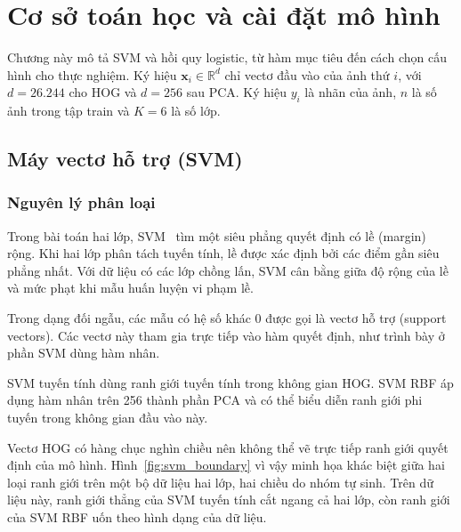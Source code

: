 \section{Cơ sở toán học và cài đặt mô hình}
\label{sec:mo_hinh}

Chương này mô tả SVM và hồi quy logistic, từ hàm mục tiêu đến cách chọn cấu hình cho thực nghiệm. Ký hiệu $\mathbf{x}_i \in \mathbb{R}^d$ chỉ vectơ đầu vào của ảnh thứ $i$, với $d = 26.244$ cho HOG và $d = 256$ sau PCA. Ký hiệu $y_i$ là nhãn của ảnh, $n$ là số ảnh trong tập train và $K = 6$ là số lớp.

\subsection{Máy vectơ hỗ trợ (SVM)}
\label{sec:svm}

\subsubsection{Nguyên lý phân loại}

Trong bài toán hai lớp, SVM~\cite{cortes1995svm} tìm một siêu phẳng quyết định có lề (margin) rộng. Khi hai lớp phân tách tuyến tính, lề được xác định bởi các điểm gần siêu phẳng nhất. Với dữ liệu có các lớp chồng lấn, SVM cân bằng giữa độ rộng của lề và mức phạt khi mẫu huấn luyện vi phạm lề.

Trong dạng đối ngẫu, các mẫu có hệ số khác 0 được gọi là vectơ hỗ trợ (support vectors). Các vectơ này tham gia trực tiếp vào hàm quyết định, như trình bày ở phần SVM dùng hàm nhân.

SVM tuyến tính dùng ranh giới tuyến tính trong không gian HOG. SVM RBF áp dụng hàm nhân trên 256 thành phần PCA và có thể biểu diễn ranh giới phi tuyến trong không gian đầu vào này.

Vectơ HOG có hàng chục nghìn chiều nên không thể vẽ trực tiếp ranh giới quyết định của mô hình. Hình~\ref{fig:svm_boundary} vì vậy minh họa khác biệt giữa hai loại ranh giới trên một bộ dữ liệu hai lớp, hai chiều do nhóm tự sinh. Trên dữ liệu này, ranh giới thẳng của SVM tuyến tính cắt ngang cả hai lớp, còn ranh giới của SVM RBF uốn theo hình dạng của dữ liệu.

